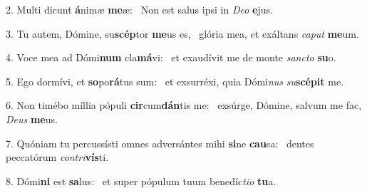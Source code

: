 2. Multi dicunt \textbf{á}nimæ \textbf{me}æ: \ast\  Non est salus ipsi in \textit{De}\textit{o} \textbf{e}jus.\

3. Tu autem, Dómine, su\textbf{scép}tor \textbf{me}us es, \ast\  glória mea, et exáltans \textit{ca}\textit{put} \textbf{me}um.\

4. Voce mea ad Dómi\textbf{num} cla\textbf{má}vi: \ast\  et exaudívit me de monte \textit{sanc}\textit{to} \textbf{su}o.\

5. Ego dormívi, et \textbf{so}po\textbf{rá}tus sum: \ast\  et exsurréxi, quia Dómi\textit{nus} \textit{su}\textbf{scé}\textbf{pit} me.\

6. Non timébo míllia pópuli \textbf{cir}cum\textbf{dán}tis me: \ast\  exsúrge, Dómine, salvum me fac, \textit{De}\textit{us} \textbf{me}us.\

7. Quóniam tu percussísti omnes adversántes mihi \textbf{si}ne \textbf{cau}sa: \ast\  dentes peccatórum \textit{con}\textit{tri}\textbf{vís}ti.\

8. Dómi\textbf{ni} est \textbf{sa}lus: \ast\  et super pópulum tuum benedíc\textit{ti}\textit{o} \textbf{tu}a.\

